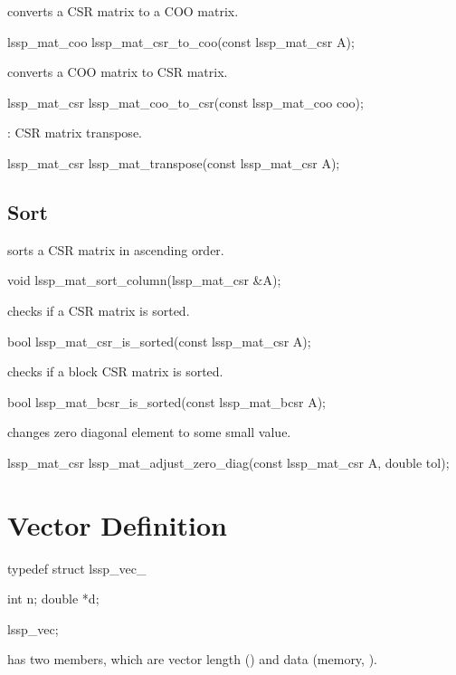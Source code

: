  converts a CSR matrix to a COO matrix.
\begin{evb}
lssp_mat_coo lssp_mat_csr_to_coo(const lssp_mat_csr A);
\end{evb}

 converts a COO matrix to CSR matrix.
\begin{evb}
lssp_mat_csr lssp_mat_coo_to_csr(const lssp_mat_coo coo);
\end{evb}

: CSR matrix transpose.
\begin{evb}
lssp_mat_csr lssp_mat_transpose(const lssp_mat_csr A);
\end{evb}

\subsection{Sort}

 sorts a CSR matrix in ascending order.
\begin{evb}
void lssp_mat_sort_column(lssp_mat_csr &A);
\end{evb}

 checks if a CSR matrix is sorted.
\begin{evb}
bool lssp_mat_csr_is_sorted(const lssp_mat_csr A);
\end{evb}

 checks if a block CSR matrix is sorted.
\begin{evb}
bool lssp_mat_bcsr_is_sorted(const lssp_mat_bcsr A);
\end{evb}

 changes zero diagonal element to some small value.
\begin{evb}
lssp_mat_csr lssp_mat_adjust_zero_diag(const lssp_mat_csr A, double tol);
\end{evb}

\section{Vector Definition}

\begin{evb}
typedef struct lssp_vec_
{
    int n;
    double *d;

} lssp_vec;
\end{evb}

 has two members, which are vector length () and data (memory,
).

